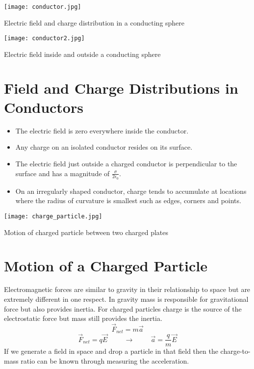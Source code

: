    
   \begin{marginfigure}[-180pt]%
  \texttt{[image: conductor.jpg]}
  \caption{Electric field and charge distribution in a conducting sphere}
  \label{fig:marginfig}
\end{marginfigure}

\begin{marginfigure}[40pt]%
  \texttt{[image: conductor2.jpg]}
  \caption{Electric field inside and outside a conducting sphere}
  \label{fig:marginfig}
\end{marginfigure}
   
 \section{Field and Charge Distributions in Conductors}
 \begin{itemize}
 \item The electric field is zero everywhere inside the conductor.
 \item  Any charge on an isolated conductor resides on its surface.
 \item  The electric field just outside a charged conductor is perpendicular to the surface and has a magnitude of $\frac{\sigma}{2\epsilon_0}$.
 \item On an irregularly shaped conductor, charge tends to accumulate at locations where the radius of curvature is smallest such as edges, corners and points.
 \end{itemize}
 

\begin{marginfigure}[80pt]%
  \texttt{[image: charge\_particle.jpg]}
  \caption{Motion of charged particle between two charged plates}
  \label{fig:marginfig}
\end{marginfigure}

 \section{Motion of a Charged Particle}
 Electromagnetic forces are similar to gravity in their relationship to space but are extremely different in one respect.  In gravity mass is responsible for gravitational force but also provides inertia.  For charged particles charge is the source of the electrostatic force but mass still provides the inertia.  
 $$\overrightarrow{F}_{net}=m\overrightarrow{a}$$
 $$\overrightarrow{F}_{net}=q\overrightarrow{E} \hspace{1cm} \longrightarrow \hspace{1cm} \overrightarrow{a}=\frac{q}{m}\overrightarrow{E}$$
 If we generate a field in space and drop a particle in that field then the charge-to-mass ratio can be known through measuring the acceleration.

